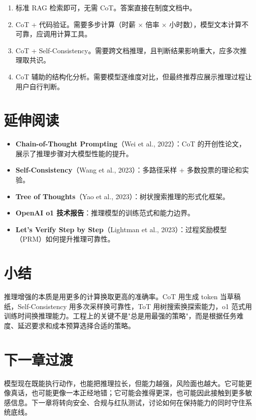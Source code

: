 \begin{solution}
\begin{enumerate}
  \item 标准 RAG 检索即可，无需 CoT。答案直接在制度文档中。
  \item CoT + 代码验证。需要多步计算（时薪 × 倍率 × 小时数），模型文本计算不可靠，应调用计算工具。
  \item CoT + Self-Consistency。需要跨文档推理，且判断结果影响重大，应多次推理取共识。
  \item CoT 辅助的结构化分析。需要模型逐维度对比，但最终推荐应展示推理过程让用户自行判断。
\end{enumerate}
\end{solution}

\section{延伸阅读}
\begin{itemize}
  \item \textbf{Chain-of-Thought Prompting}（Wei et al., 2022）：CoT 的开创性论文，展示了推理步骤对大模型性能的提升。
  \item \textbf{Self-Consistency}（Wang et al., 2023）：多路径采样 + 多数投票的理论和实验。
  \item \textbf{Tree of Thoughts}（Yao et al., 2023）：树状搜索推理的形式化框架。
  \item \textbf{OpenAI o1 技术报告}：推理模型的训练范式和能力边界。
  \item \textbf{Let's Verify Step by Step}（Lightman et al., 2023）：过程奖励模型（PRM）如何提升推理可靠性。
\end{itemize}

\section{小结}
推理增强的本质是用更多的计算换取更高的准确率。CoT 用生成 token 当草稿纸，Self-Consistency 用多次采样换可靠性，ToT 用树搜索换探索能力，o1 范式用训练时间换推理能力。工程上的关键不是"总是用最强的策略"，而是根据任务难度、延迟要求和成本预算选择合适的策略。

\section{下一章过渡}
模型现在既能执行动作，也能把推理拉长，但能力越强，风险面也越大。它可能更像真话，也可能更像一本正经地错；它可能会推得更深，也可能因此接触到更多敏感信息。下一章将转向安全、合规与红队测试，讨论如何在保持能力的同时守住系统底线。
